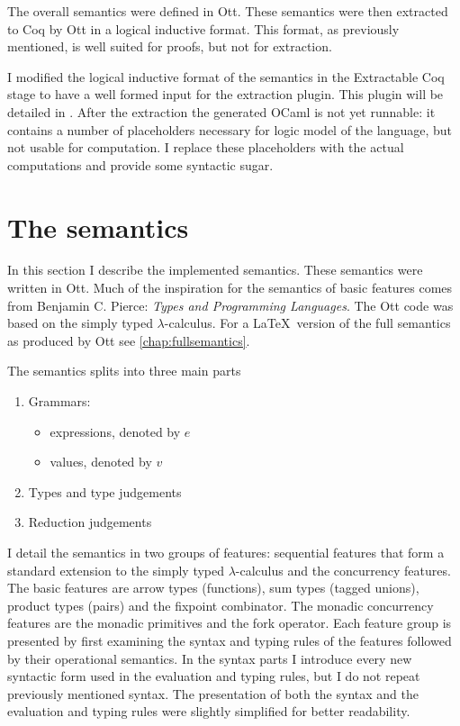\documentclass[12pt,twoside,notitlepage]{report}
\theoremstyle{plain}%
\theoremstyle{definition}
\theoremstyle{remark}
\begin{document}
The overall semantics were defined in Ott. These semantics were then extracted to Coq by Ott in a logical inductive format. This format, as previously mentioned, is well suited for proofs, but not for extraction. 

I modified the logical inductive format of the semantics in the Extractable Coq stage to have a well formed input for the extraction plugin. This plugin will be detailed in . After the extraction the generated OCaml is not yet runnable: it contains a number of placeholders necessary for logic model of the language, but not usable for computation. I replace these placeholders with the actual computations and provide some syntactic sugar.
\section{The semantics}\label{sec:the-semanticssec:the-semantics}
In this section I describe the implemented semantics. These semantics were written in Ott.  Much of the inspiration for the semantics of basic features comes from Benjamin C. Pierce: \textit{Types and Programming Languages}\cite{pierce2002types}. The Ott code was based on the simply typed $ \lambda $-calculus\cite{church1940formulation}. For a \LaTeX\, version of the full semantics as produced by Ott see \cref{chap:fullsemantics}.

 
The semantics splits into three main parts
\begin{enumerate}
\item{Grammars:\begin{itemize}
\item{expressions, denoted by $ e $}
\item{values, denoted by $ v $}
\end{itemize}}
\item{Types and type judgements}
\item{Reduction judgements}
\end{enumerate}

I detail the semantics in two groups of features: sequential features that form a standard extension to the simply typed $ \lambda $-calculus and the concurrency features. The basic features are arrow types (functions), sum types (tagged unions), product types (pairs) and the fixpoint combinator. The monadic concurrency features are the monadic primitives and the fork operator. Each feature group is presented by first examining the syntax and typing rules of the features followed by their operational semantics. In the syntax parts I introduce every new syntactic form used in the evaluation and typing rules, but I do not repeat previously mentioned syntax. The presentation of both the syntax and the evaluation and typing rules were slightly simplified for better readability.   
\end{document}
